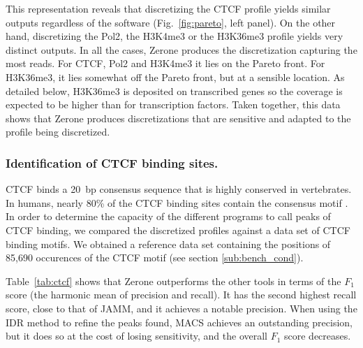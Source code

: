 \documentclass{bioinfo}
\begin{document}
This representation reveals that discretizing the CTCF profile yields
similar outputs regardless of the software (Fig.~\ref{fig:pareto},
left panel). On the other hand, discretizing the Pol2, the H3K4me3 or
the H3K36me3 profile yields very distinct outputs. In
all the cases, Zerone produces the discretization capturing the most
reads. For CTCF, Pol2 and H3K4me3 it lies on the Pareto front. For
H3K36me3, it lies somewhat off the Pareto front, but at a sensible
location. As detailed below, H3K36me3 is deposited on transcribed
genes \citep{pmid16122420,pmid23739122} so the coverage is expected to
be higher than for transcription factors. Taken together, this data
shows that Zerone produces discretizations that are sensitive and
adapted to the profile being discretized.

\subsubsection{Identification of CTCF binding sites.}
CTCF binds a 20~bp consensus sequence that is highly conserved in
vertebrates. In humans, nearly 80\% of the CTCF binding sites contain
the consensus motif \citep{pmid17382889}. In order to determine the
capacity of the different programs to call peaks of CTCF binding, we
compared the discretized profiles against a data set of CTCF binding
motifs. We obtained a reference data set containing the positions of
85,690 occurences of the CTCF motif (see section
\ref{sub:bench_cond}).

Table~\ref{tab:ctcf} shows that Zerone outperforms the other tools
in terms of the $F_1$ score (the harmonic mean of precision and
recall). It has the second highest recall score, close to that of JAMM,
and it achieves a notable precision.
When using the IDR method to refine the peaks found, MACS achieves an
outstanding precision, but it does so at the cost of losing sensitivity,
and the overall $F_1$ score decreases.
\end{document}
